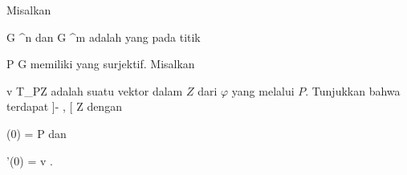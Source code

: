 {

Misalkan

\mavergleichskette
{\vergleichskette
{ G
}
{ \subseteq }{ \R^n
}
{  }{
}
{    }{
}
{   }{
}
}
{}{}{}
dan
\maabbdisp {\varphi} { G } { \R^m
} {}
adalah
yang pada titik

\mavergleichskette
{\vergleichskette
{ P
}
{ \in }{ G
}
{  }{
}
{    }{
}
{   }{
}
}
{}{}{}
memiliki
yang surjektif. Misalkan

\mavergleichskette
{\vergleichskette
{ v
}
{ \in }{ T_PZ
}
{  }{
}
{    }{
}
{   }{
}
}
{}{}{}
adalah suatu vektor dalam
$Z$ dari $\varphi$ yang melalui $P$. Tunjukkan bahwa terdapat
\maabbdisp {\gamma} { ]- \epsilon, \epsilon[ } { Z
} {}
 {} {}
dengan

\mavergleichskette
{\vergleichskette
{ \gamma(0)
}
{ = }{ P
}
{  }{
}
{    }{
}
{   }{
}
}
{}{}{}
dan

\mavergleichskettedisp
{\vergleichskette
{ \gamma'(0)
}
{ =} { v
}
{ } {
}
{ } {
}
{ } {
}
}
{}{}{}.

}
